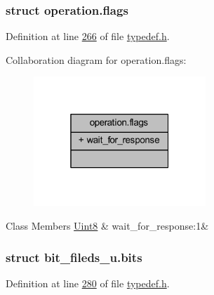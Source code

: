 \label{da/d82/a00091}
\hypertarget{a00001_da/d82/a00091}{}
\subsubsection{struct operation.\+flags}


Definition at line \hyperlink{a00001_source_l00266}{266} of file \hyperlink{a00001_source}{typedef.\+h}.



Collaboration diagram for operation.\+flags\+:
\nopagebreak
\begin{figure}[H]
\begin{center}
\leavevmode
\includegraphics[width=184pt]{dc/d6a/a00261}
\end{center}
\end{figure}
\begin{DoxyFields}{Class Members}
\hypertarget{a00001_a4b9f2d21defc6a6eaf4be3f310b65442}{\hyperlink{a00001_a979e3e23b9a449e69ab6a8a83b6042f8}{Uint8}}\label{a00001_a4b9f2d21defc6a6eaf4be3f310b65442}
&
wait\+\_\+for\+\_\+response\+:1&
\\
\hline

\end{DoxyFields}
\label{d1/d22/a00057}
\hypertarget{a00001_d1/d22/a00057}{}
\subsubsection{struct bit\+\_\+fileds\+\_\+u.\+bits}


Definition at line \hyperlink{a00001_source_l00280}{280} of file \hyperlink{a00001_source}{typedef.\+h}.



